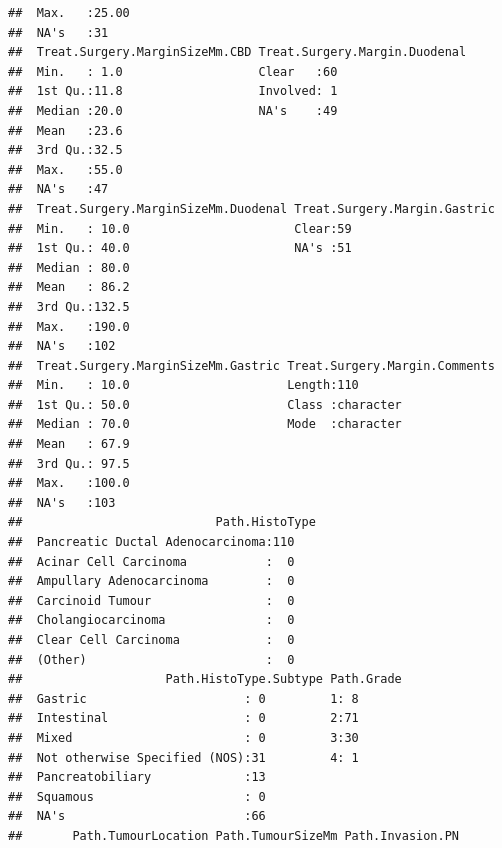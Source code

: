 \documentclass{article}
\begin{document}
\begin{knitrout}
\begin{kframe}
\begin{verbatim}
##  Max.   :25.00                                             
##  NA's   :31                                                
##  Treat.Surgery.MarginSizeMm.CBD Treat.Surgery.Margin.Duodenal
##  Min.   : 1.0                   Clear   :60                  
##  1st Qu.:11.8                   Involved: 1                  
##  Median :20.0                   NA's    :49                  
##  Mean   :23.6                                                
##  3rd Qu.:32.5                                                
##  Max.   :55.0                                                
##  NA's   :47                                                  
##  Treat.Surgery.MarginSizeMm.Duodenal Treat.Surgery.Margin.Gastric
##  Min.   : 10.0                       Clear:59                    
##  1st Qu.: 40.0                       NA's :51                    
##  Median : 80.0                                                   
##  Mean   : 86.2                                                   
##  3rd Qu.:132.5                                                   
##  Max.   :190.0                                                   
##  NA's   :102                                                     
##  Treat.Surgery.MarginSizeMm.Gastric Treat.Surgery.Margin.Comments
##  Min.   : 10.0                      Length:110                   
##  1st Qu.: 50.0                      Class :character             
##  Median : 70.0                      Mode  :character             
##  Mean   : 67.9                                                   
##  3rd Qu.: 97.5                                                   
##  Max.   :100.0                                                   
##  NA's   :103                                                     
##                           Path.HistoType
##  Pancreatic Ductal Adenocarcinoma:110   
##  Acinar Cell Carcinoma           :  0   
##  Ampullary Adenocarcinoma        :  0   
##  Carcinoid Tumour                :  0   
##  Cholangiocarcinoma              :  0   
##  Clear Cell Carcinoma            :  0   
##  (Other)                         :  0   
##                    Path.HistoType.Subtype Path.Grade
##  Gastric                      : 0         1: 8      
##  Intestinal                   : 0         2:71      
##  Mixed                        : 0         3:30      
##  Not otherwise Specified (NOS):31         4: 1      
##  Pancreatobiliary             :13                   
##  Squamous                     : 0                   
##  NA's                         :66                   
##       Path.TumourLocation Path.TumourSizeMm Path.Invasion.PN

\end{verbatim}
\end{kframe}
\end{knitrout}
\end{document}
